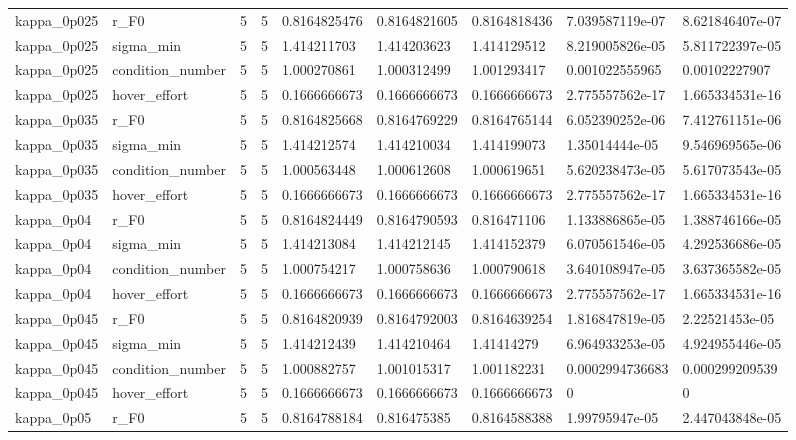 \begin{tabular}{@{}lllllllll@{}}
kappa\_0p025 & r\_F0 & 5 & 5 & 0.8164825476 & 0.8164821605 & 0.8164818436 & 7.039587119e-07 & 8.621846407e-07 \\
kappa\_0p025 & sigma\_min & 5 & 5 & 1.414211703 & 1.414203623 & 1.414129512 & 8.219005826e-05 & 5.811722397e-05 \\
kappa\_0p025 & condition\_number & 5 & 5 & 1.000270861 & 1.000312499 & 1.001293417 & 0.001022555965 & 0.00102227907 \\
kappa\_0p025 & hover\_effort & 5 & 5 & 0.1666666673 & 0.1666666673 & 0.1666666673 & 2.775557562e-17 & 1.665334531e-16 \\
kappa\_0p035 & r\_F0 & 5 & 5 & 0.8164825668 & 0.8164769229 & 0.8164765144 & 6.052390252e-06 & 7.412761151e-06 \\
kappa\_0p035 & sigma\_min & 5 & 5 & 1.414212574 & 1.414210034 & 1.414199073 & 1.35014444e-05 & 9.546969565e-06 \\
kappa\_0p035 & condition\_number & 5 & 5 & 1.000563448 & 1.000612608 & 1.000619651 & 5.620238473e-05 & 5.617073543e-05 \\
kappa\_0p035 & hover\_effort & 5 & 5 & 0.1666666673 & 0.1666666673 & 0.1666666673 & 2.775557562e-17 & 1.665334531e-16 \\
kappa\_0p04 & r\_F0 & 5 & 5 & 0.8164824449 & 0.8164790593 & 0.816471106 & 1.133886865e-05 & 1.388746166e-05 \\
kappa\_0p04 & sigma\_min & 5 & 5 & 1.414213084 & 1.414212145 & 1.414152379 & 6.070561546e-05 & 4.292536686e-05 \\
kappa\_0p04 & condition\_number & 5 & 5 & 1.000754217 & 1.000758636 & 1.000790618 & 3.640108947e-05 & 3.637365582e-05 \\
kappa\_0p04 & hover\_effort & 5 & 5 & 0.1666666673 & 0.1666666673 & 0.1666666673 & 2.775557562e-17 & 1.665334531e-16 \\
kappa\_0p045 & r\_F0 & 5 & 5 & 0.8164820939 & 0.8164792003 & 0.8164639254 & 1.816847819e-05 & 2.22521453e-05 \\
kappa\_0p045 & sigma\_min & 5 & 5 & 1.414212439 & 1.414210464 & 1.41414279 & 6.964933253e-05 & 4.924955446e-05 \\
kappa\_0p045 & condition\_number & 5 & 5 & 1.000882757 & 1.001015317 & 1.001182231 & 0.0002994736683 & 0.000299209539 \\
kappa\_0p045 & hover\_effort & 5 & 5 & 0.1666666673 & 0.1666666673 & 0.1666666673 & 0 & 0 \\
kappa\_0p05 & r\_F0 & 5 & 5 & 0.8164788184 & 0.816475385 & 0.8164588388 & 1.99795947e-05 & 2.447043848e-05 \\

\end{tabular}
